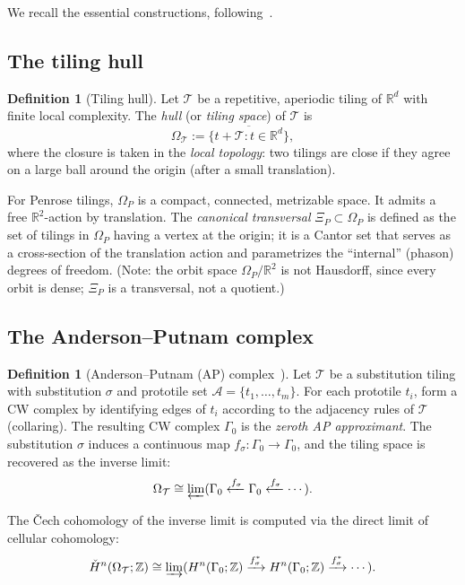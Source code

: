 \documentclass[12pt]{article}
\theoremstyle{definition}
\newtheorem{definition}[theorem]{Definition}
\theoremstyle{remark}
\newcommand{\RR}{\mathbb{R}}
\newcommand{\ZZ}{\mathbb{Z}}
\newcommand{\Hcech}{\check{H}}
\begin{document}
We recall the essential constructions, following~\cite{AndersonPutnam1998,Sadun2008,KellendonkPutnam2006}.

\subsection{The tiling hull}

\begin{definition}[Tiling hull]
Let $\mathcal{T}$ be a repetitive, aperiodic tiling of $\RR^d$ with finite local complexity. The \emph{hull} (or \emph{tiling space}) of $\mathcal{T}$ is
\[
\Omega_{\mathcal{T}} := \overline{\{t + \mathcal{T} : t \in \RR^d\}},
\]
where the closure is taken in the \emph{local topology}: two tilings are close if they agree on a large ball around the origin (after a small translation).
\end{definition}

For Penrose tilings, $\Omega_P$ is a compact, connected, metrizable space. It admits a free $\RR^2$-action by translation. The \emph{canonical transversal} $\Xi_P \subset \Omega_P$ is defined as the set of tilings in $\Omega_P$ having a vertex at the origin; it is a Cantor set that serves as a cross-section of the translation action and parametrizes the ``internal'' (phason) degrees of freedom. (Note: the orbit space $\Omega_P / \RR^2$ is not Hausdorff, since every orbit is dense; $\Xi_P$ is a transversal, not a quotient.)

\subsection{The Anderson--Putnam complex}

\begin{definition}[Anderson--Putnam (AP) complex~\cite{AndersonPutnam1998}]
\label{def:AP-complex}
Let $\mathcal{T}$ be a substitution tiling with substitution $\sigma$ and prototile set $\mathcal{A} = \{t_1, \ldots, t_m\}$. For each prototile $t_i$, form a CW complex by identifying edges of $t_i$ according to the adjacency rules of $\mathcal{T}$ (collaring). The resulting CW complex $\Gamma_0$ is the \emph{zeroth AP approximant}. The substitution $\sigma$ induces a continuous map $f_\sigma: \Gamma_0 \to \Gamma_0$, and the tiling space is recovered as the inverse limit:
\[
\Omega_{\mathcal{T}} \cong \varprojlim(\Gamma_0 \xleftarrow{f_\sigma} \Gamma_0 \xleftarrow{f_\sigma} \cdots).
\]
\end{definition}

The \v{C}ech cohomology of the inverse limit is computed via the direct limit of cellular cohomology:
\begin{equation}
\Hcech^n(\Omega_{\mathcal{T}}; \ZZ) \cong \varinjlim(H^n(\Gamma_0; \ZZ) \xrightarrow{f_\sigma^*} H^n(\Gamma_0; \ZZ) \xrightarrow{f_\sigma^*} \cdots).
\label{eq:cech-direct-limit}
\end{equation}
\end{document}
